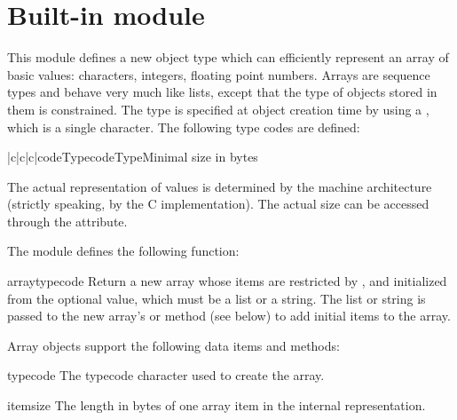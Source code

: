 \section{Built-in module }

This module defines a new object type which can efficiently represent
an array of basic values: characters, integers, floating point
numbers.  Arrays are sequence types and behave very much like lists,
except that the type of objects stored in them is constrained.  The
type is specified at object creation time by using a ,
which is a single character.  The following type codes are defined:

\begin{tableiii}{|c|c|c|}{code}{Typecode}{Type}{Minimal size in bytes}
\end{tableiii}

The actual representation of values is determined by the machine
architecture (strictly speaking, by the C implementation).  The actual
size can be accessed through the  attribute.

The module defines the following function:

\renewcommand{\indexsubitem}{(in module array)}

\begin{funcdesc}{array}{typecode}
Return a new array whose items are restricted by , and
initialized from the optional  value, which must be a
list or a string.  The list or string is passed to the new array's
 or  method (see below) to add
initial items to the array.
\end{funcdesc}

Array objects support the following data items and methods:

\begin{datadesc}{typecode}
The typecode character used to create the array.
\end{datadesc}

\begin{datadesc}{itemsize}
The length in bytes of one array item in the internal representation.
\end{datadesc}

